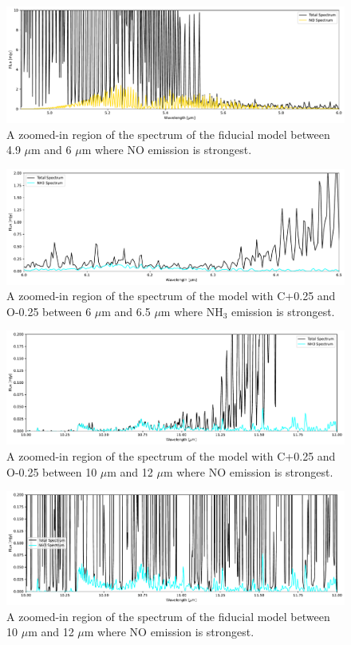\documentclass[oneside, single, authoryear, semicolon]{lion-msc}
\newcommand{\4}{$_4$}
\newcommand{\3}{$_3$}
\newcommand{\2}{$_2$}
\begin{document}
\begin{figure}[!ht]
    \centering
    \includegraphics[width=\linewidth]{Figures/NO_region.pdf}
    \caption{A zoomed-in region of the spectrum of the fiducial model between 4.9 $\mu$m and 6 $\mu$m where NO emission is strongest.}
    \label{fig: NO region}
\end{figure}

\begin{figure}[!ht]
    \centering
    \includegraphics[width=\linewidth]{Figures/NH3_region1.pdf}
    \caption{A zoomed-in region of the spectrum of the model with C+0.25 and O-0.25 between 6 $\mu$m and 6.5 $\mu$m where NH\3 emission is strongest.}
    \label{fig: NH3 region 1}
\end{figure}
\begin{figure}[!ht]
    \centering
    \includegraphics[width=\linewidth]{Figures/NH3_region2.pdf}
    \caption{A zoomed-in region of the spectrum of the model with C+0.25 and O-0.25 between 10 $\mu$m and 12 $\mu$m where NO emission is strongest.}
    \label{fig: NH3 region 2}
\end{figure}
\begin{figure}[!ht]
    \centering
    \includegraphics[width=\linewidth]{Figures/NH3_region3.pdf}
    \caption{A zoomed-in region of the spectrum of the fiducial model between 10 $\mu$m and 12 $\mu$m where NO emission is strongest.}
    \label{fig: NH3 region 3}
\end{figure}
\end{document}
